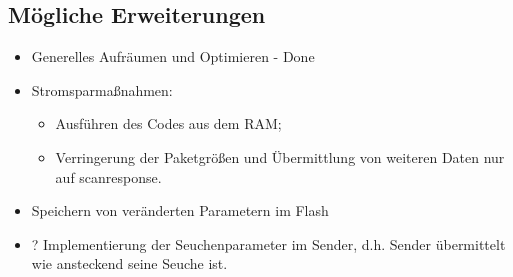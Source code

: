 \documentclass[11pt,ngerman]{scrartcl} %
\begin{document}
\subsection{Mögliche Erweiterungen}
\begin{itemize}
\item  Generelles Aufräumen und Optimieren - Done
\item  Stromsparmaßnahmen: 
\begin{itemize}
\item 	Ausführen des Codes aus dem RAM; 
\item Verringerung der Paketgrößen und Übermittlung von weiteren Daten nur auf scanresponse. 
\end{itemize} 
\item  Speichern von veränderten Parametern im Flash
\item  ? Implementierung der Seuchenparameter im Sender, d.h. Sender übermittelt wie ansteckend seine Seuche ist.
\end{itemize}
\end{document}
